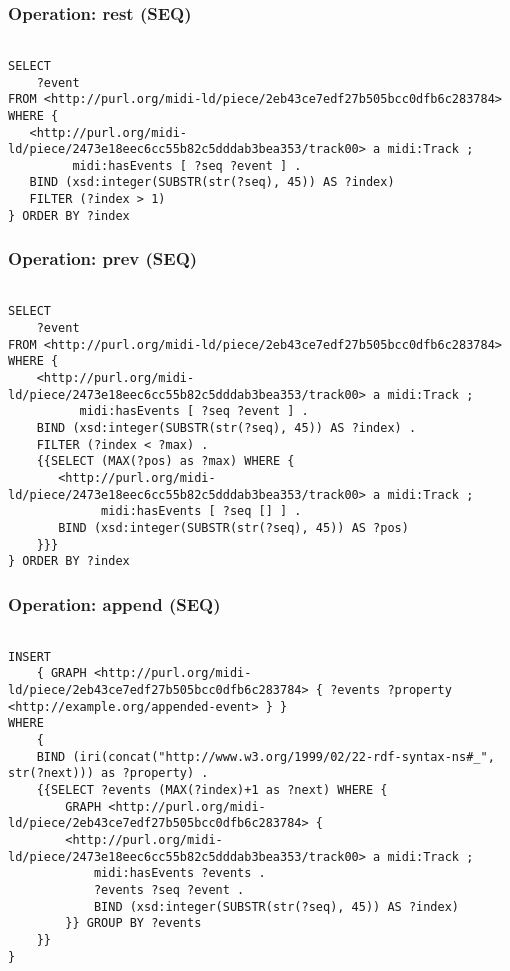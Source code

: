 \subsubsection{Operation: rest (SEQ)}
\label{query:SEQ:rest}

\begin{lstlisting}[language=sparql]

SELECT
	?event
FROM <http://purl.org/midi-ld/piece/2eb43ce7edf27b505bcc0dfb6c283784>
WHERE {
   <http://purl.org/midi-ld/piece/2473e18eec6cc55b82c5dddab3bea353/track00> a midi:Track ;
         midi:hasEvents [ ?seq ?event ] .
   BIND (xsd:integer(SUBSTR(str(?seq), 45)) AS ?index)
   FILTER (?index > 1)
} ORDER BY ?index

\end{lstlisting}

\subsubsection{Operation: prev (SEQ)}
\label{query:SEQ:prev}

\begin{lstlisting}[language=sparql]

SELECT
	?event
FROM <http://purl.org/midi-ld/piece/2eb43ce7edf27b505bcc0dfb6c283784>
WHERE {
    <http://purl.org/midi-ld/piece/2473e18eec6cc55b82c5dddab3bea353/track00> a midi:Track ;
          midi:hasEvents [ ?seq ?event ] .
    BIND (xsd:integer(SUBSTR(str(?seq), 45)) AS ?index) .
    FILTER (?index < ?max) .
    {{SELECT (MAX(?pos) as ?max) WHERE {
 	   <http://purl.org/midi-ld/piece/2473e18eec6cc55b82c5dddab3bea353/track00> a midi:Track ;
 	         midi:hasEvents [ ?seq [] ] .
 	   BIND (xsd:integer(SUBSTR(str(?seq), 45)) AS ?pos)
 	}}}
} ORDER BY ?index

\end{lstlisting}

\subsubsection{Operation: append (SEQ)}
\label{query:SEQ:append}

\begin{lstlisting}[language=sparql]

INSERT
	{ GRAPH <http://purl.org/midi-ld/piece/2eb43ce7edf27b505bcc0dfb6c283784> { ?events ?property <http://example.org/appended-event> } }
WHERE 
	{  
	BIND (iri(concat("http://www.w3.org/1999/02/22-rdf-syntax-ns#_", str(?next))) as ?property) .
	{{SELECT ?events (MAX(?index)+1 as ?next) WHERE {
		GRAPH <http://purl.org/midi-ld/piece/2eb43ce7edf27b505bcc0dfb6c283784> {
		<http://purl.org/midi-ld/piece/2473e18eec6cc55b82c5dddab3bea353/track00> a midi:Track ;
			midi:hasEvents ?events .
			?events ?seq ?event .
			BIND (xsd:integer(SUBSTR(str(?seq), 45)) AS ?index)
		}} GROUP BY ?events
	}}			
}

\end{lstlisting}

